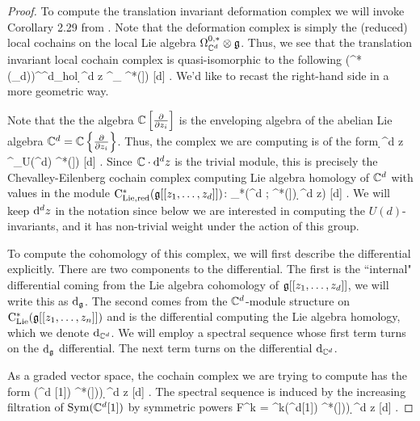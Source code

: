 \begin{proof}
To compute the translation invariant deformation complex we will invoke Corollary 2.29 from \cite{BWhol}. 
Note that the deformation complex is simply the (reduced) local cochains on the local Lie algebra $\Omega^{0,*}_{\mathbb C^d} \otimes \mathfrak g$. 
Thus, we see that the translation invariant local cochain complex is quasi-isomorphic to the following
\beqn
\left(\cloc^*(\sG_d)\right)^{\CC^{d}_{\rm hol}} \; \simeq \; \CC \cdot \d^d z \tensor^{\LL}_{\CC{}} \cred^*(\fg[[z_1,\ldots,z_d]])  [d] .
\eeqn
We'd like to recast the right-hand side in a more geometric way. 

Note that the the algebra $\mathbb C\left[\frac{\partial}{\partial z_i}\right]$ is the enveloping algebra of the abelian Lie algebra $\mathbb C^d = \mathbb C\left\{\frac{\partial}{\partial z_i}\right\}$. 
Thus, the complex we are computing is of the form
\beqn
\CC \cdot \d^d z \tensor^{\LL}_{U(\CC^d)} \cred^*(\fg[[z_1,\ldots,z_d]]) [d] .
\eeqn
Since $\mathbb C \cdot {\rm d}^d z$ is the trivial module, this is precisely the Chevalley-Eilenberg cochain complex computing Lie algebra homology of $\mathbb C^d$ with values in the module ${\rm C}_{\rm Lie, red}^*(\mathfrak g[[z_1,\ldots,z_d]])$:
\beqn
\clieu_*\left(\CC^d ; \cred^*(\fg[[z_1,\ldots,z_d]]) \d^d z\right) [d] .
\eeqn
We will keep ${\rm d}^d z$ in the notation since below we are interested in computing the $U(d)$-invariants, and it has non-trivial weight under the action of this group.

To compute the cohomology of this complex, we will first describe the differential explicitly. 
There are two components to the differential.
The first is the ``internal" differential coming from the Lie algebra cohomology of $\mathfrak g [[z_1,\ldots,z_d]]$, we will write this as ${\rm d}_{\mathfrak g}$. 
The second comes from the $\mathbb C^d$-module structure on ${\rm C}_{{\rm Lie}}^*(\mathfrak g[[z_1,\ldots,z_n]])$ and is the differential computing the Lie algebra homology, which we denote ${\rm d}_{\mathbb C^d}$. 
We will employ a spectral sequence whose first term turns on the ${\rm d}_{\mathfrak g}$ differential.
The next term turns on the differential ${\rm d}_{\mathbb C^d}$.

As a graded vector space, the cochain complex we are trying to compute has the form
\beqn
\Sym(\CC^d [1]) \tensor \cred^*\left(\fg[[z_1,\ldots,z_d]])\right) \d^d z [d] .
\eeqn
The spectral sequence is induced by the increasing filtration of ${\rm Sym}(\mathbb C^d [1])$ by symmetric powers
\beqn
F^k = \Sym^{\leq k}(\CC^d[1]) \tensor \cred^*\left(\fg[[z_1,\ldots,z_d]])\right) \d^d z [d] .
\eeqn


\end{proof}
